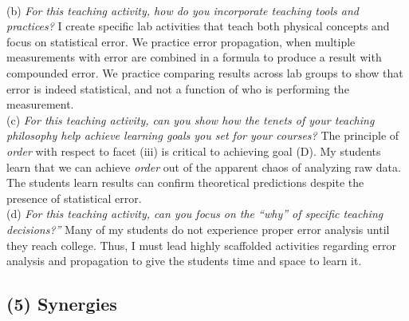 \documentclass[../../../main.tex]{subfiles}
\begin{document}
\\
\vspace{0.25cm}
(b) \textit{For this teaching activity, how do you incorporate teaching tools and practices?}  I create specific lab activities that teach both physical concepts and focus on statistical error.  We practice error propagation, when multiple measurements with error are combined in a formula to produce a result with compounded error.  We practice comparing results across lab groups to show that error is indeed statistical, and not a function of who is performing the measurement.
\\
\vspace{0.25cm}
(c) \textit{For this teaching activity, can you show how the tenets of your teaching philosophy help achieve learning goals you set for your courses?}  The principle of \textit{order} with respect to facet (iii) is critical to achieving goal (D).  My students learn that we can achieve \textit{order} out of the apparent chaos of analyzing raw data.  The students learn results can confirm theoretical predictions despite the presence of statistical error.
\\
\vspace{0.25cm}
(d) \textit{For this teaching activity, can you focus on the ``why'' of specific teaching decisions?''} Many of my students do not experience proper error analysis until they reach college.  Thus, I must lead highly scaffolded activities regarding error analysis and propagation to give the students time and space to learn it.

\subsection{(5) Synergies}
\end{document}
